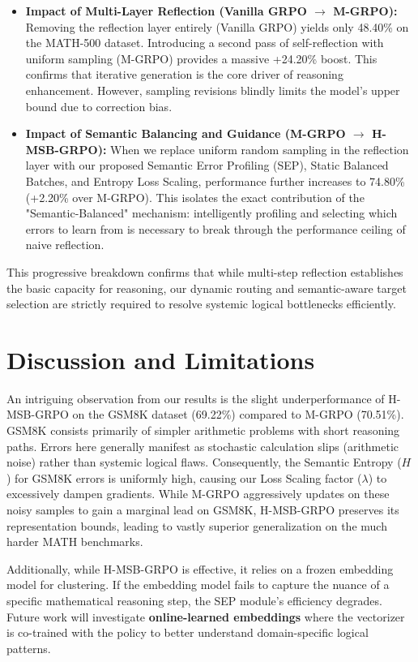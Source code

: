 \documentclass[letterpaper]{article}
\begin{document}
\begin{itemize}
    \item \textbf{Impact of Multi-Layer Reflection (Vanilla GRPO $\rightarrow$ M-GRPO):} Removing the reflection layer entirely (Vanilla GRPO) yields only 48.40\% on the MATH-500 dataset. Introducing a second pass of self-reflection with uniform sampling (M-GRPO) provides a massive +24.20\% boost. This confirms that iterative generation is the core driver of reasoning enhancement. However, sampling revisions blindly limits the model's upper bound due to correction bias.
    \item \textbf{Impact of Semantic Balancing and Guidance (M-GRPO $\rightarrow$ H-MSB-GRPO):} When we replace uniform random sampling in the reflection layer with our proposed Semantic Error Profiling (SEP), Static Balanced Batches, and Entropy Loss Scaling, performance further increases to 74.80\% (+2.20\% over M-GRPO). This isolates the exact contribution of the "Semantic-Balanced" mechanism: intelligently profiling and selecting which errors to learn from is necessary to break through the performance ceiling of naive reflection.
\end{itemize}
This progressive breakdown confirms that while multi-step reflection establishes the basic capacity for reasoning, our dynamic routing and semantic-aware target selection are strictly required to resolve systemic logical bottlenecks efficiently.

\section{Discussion and Limitations}
An intriguing observation from our results is the slight underperformance of H-MSB-GRPO on the GSM8K dataset (69.22\%) compared to M-GRPO (70.51\%). GSM8K consists primarily of simpler arithmetic problems with short reasoning paths. Errors here generally manifest as stochastic calculation slips (arithmetic noise) rather than systemic logical flaws. Consequently, the Semantic Entropy ($H$) for GSM8K errors is uniformly high, causing our Loss Scaling factor ($\lambda$) to excessively dampen gradients. While M-GRPO aggressively updates on these noisy samples to gain a marginal lead on GSM8K, H-MSB-GRPO preserves its representation bounds, leading to vastly superior generalization on the much harder MATH benchmarks.

Additionally, while H-MSB-GRPO is effective, it relies on a frozen embedding model for clustering. If the embedding model fails to capture the nuance of a specific mathematical reasoning step, the SEP module's efficiency degrades. Future work will investigate \textbf{online-learned embeddings} where the vectorizer is co-trained with the policy to better understand domain-specific logical patterns.
\end{document}
